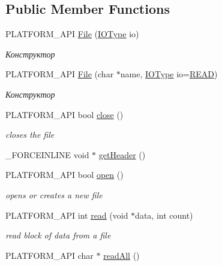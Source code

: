 \subsection*{Public Member Functions}
\begin{DoxyCompactItemize}
\item 
\hypertarget{classcsad_1_1_file_a4319b35b4fdc39d2fa1c539959f6c325}{P\-L\-A\-T\-F\-O\-R\-M\-\_\-\-A\-P\-I \hyperlink{classcsad_1_1_file_a4319b35b4fdc39d2fa1c539959f6c325}{File} (\hyperlink{classcsad_1_1_file_a0c256c83ef20258eb8d22826e5915d5a}{I\-O\-Type} io)}\label{classcsad_1_1_file_a4319b35b4fdc39d2fa1c539959f6c325}

\begin{DoxyCompactList}\small\item\em Конструктор \end{DoxyCompactList}\item 
\hypertarget{classcsad_1_1_file_aa5258554865f47eea4e5d91c4654804e}{P\-L\-A\-T\-F\-O\-R\-M\-\_\-\-A\-P\-I \hyperlink{classcsad_1_1_file_aa5258554865f47eea4e5d91c4654804e}{File} (char $\ast$name, \hyperlink{classcsad_1_1_file_a0c256c83ef20258eb8d22826e5915d5a}{I\-O\-Type} io=\hyperlink{classcsad_1_1_file_a0c256c83ef20258eb8d22826e5915d5aad43f934455c63c17c3fb53cfe87eb4c8}{R\-E\-A\-D})}\label{classcsad_1_1_file_aa5258554865f47eea4e5d91c4654804e}

\begin{DoxyCompactList}\small\item\em Конструктор \end{DoxyCompactList}\item 
P\-L\-A\-T\-F\-O\-R\-M\-\_\-\-A\-P\-I bool \hyperlink{classcsad_1_1_file_a5d0d38b7bf4963f0d75e7fe82dfee8e2}{close} ()
\begin{DoxyCompactList}\small\item\em closes the file \end{DoxyCompactList}\item 
\-\_\-\-F\-O\-R\-C\-E\-I\-N\-L\-I\-N\-E void $\ast$ \hyperlink{classcsad_1_1_file_a9a11f812d37f46e6cfa3e602cb13149e}{get\-Header} ()
\item 
P\-L\-A\-T\-F\-O\-R\-M\-\_\-\-A\-P\-I bool \hyperlink{classcsad_1_1_file_a16421c80ec0fef10daaafba08c8ebf86}{open} ()
\begin{DoxyCompactList}\small\item\em opens or creates a new file \end{DoxyCompactList}\item 
P\-L\-A\-T\-F\-O\-R\-M\-\_\-\-A\-P\-I int \hyperlink{classcsad_1_1_file_a25704302675d9557d3095e7280aa1975}{read} (void $\ast$data, int count)
\begin{DoxyCompactList}\small\item\em read block of data from a file \end{DoxyCompactList}\item 
\hypertarget{classcsad_1_1_file_afdc838f028cebf2dcc200571d50fddb7}{P\-L\-A\-T\-F\-O\-R\-M\-\_\-\-A\-P\-I char $\ast$ \hyperlink{classcsad_1_1_file_afdc838f028cebf2dcc200571d50fddb7}{read\-All} ()}\label{classcsad_1_1_file_afdc838f028cebf2dcc200571d50fddb7}


\end{DoxyCompactItemize}
